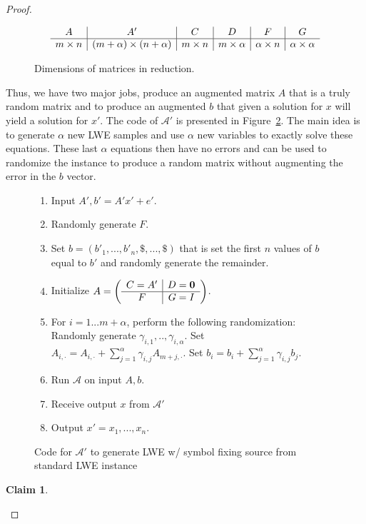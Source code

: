 \documentclass[11pt]{article}
\newcommand{\figref}[1]{\mbox{Figure~\ref{#1}}}
\newtheorem{claim}[theorem]{Claim}
\begin{document}
{\begin{proof}
\begin{figure}[b]
\[
\begin{array}{c | c | c | c | c | c}
A & A' & C & D & F & G\\\hline
m\times n & (m+\alpha)\times( n+\alpha) & m\times n & m \times \alpha & \alpha \times n & \alpha \times \alpha
\end{array}
\]
\caption{Dimensions of matrices in reduction.}
\label{fig:matrixDimension}
\end{figure}
Thus, we have two major jobs, produce an augmented matrix $A$ that is a truly random matrix and to produce an augmented $b$ that given a solution for $x$ will yield a solution for $x'$.  The code of $\mathcal{A'}$ is presented in \figref{fig:imperfectLWEreduction}.  The main idea is to generate $\alpha$ new LWE samples and use $\alpha$ new variables to exactly solve these equations.  These last $\alpha$ equations then have no errors and can be used to randomize the instance to produce a random matrix without augmenting the error in the $b$ vector.
\begin{figure}
\begin{enumerate}
\item Input $A', b' = A'x' +e'$.
\item Randomly generate $F$.
\item Set $b = (b'_1,..., b'_n, \$, ..., \$)$ that is set the first $n$ values of $b$ equal to $b'$ and randomly generate the remainder.
\item Initialize $A = \left(\begin{array}{c | c}C = A' & D = \mathbf{0}\\\hline F & G = I\end{array}\right)$.
\item For $i=1...m+\alpha$, perform the following randomization:\label{step:randomizationSearch}
\subitem Randomly generate $\gamma_{i,1},.., \gamma_{i,\alpha}$.
\subitem Set $A_{i, \cdot} = A_{i, \cdot} +\sum_{j=1}^\alpha \gamma_{i,j}A_{m+j, \cdot}$.
\subitem Set $b_i = b_i +\sum_{j=1}^\alpha \gamma_{i,j} b_j$.
\item Run $\mathcal{A}$ on input $A, b$.
\item Receive output $x$ from $\mathcal{A'}$
\item Output $x' = x_1,..., x_n$.
\end{enumerate}
\caption{Code for $\mathcal{A'}$ to generate LWE w/ symbol fixing source from standard LWE instance}
\label{fig:imperfectLWEreduction}
\end{figure}
\begin{claim}\label{cl:randomMatrix}

\end{claim}
\end{proof}}
\end{document}
